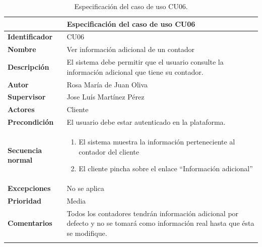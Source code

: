 \documentclass[pdftex,11pt,a4paper]{book}
\begin{document}


\renewcommand{\tablename}{Tabla}
\renewcommand{\arraystretch}{1,7}

\begin{center}
\begin{longtable}{|m{}|m{11cm}|}
\hline
\multicolumn{2}{|c|}{\textbf{Especificación del caso de uso CU06}}\\
\hline 
\endhead

\textbf{Identificador} & CU06  
\\ \hline
\textbf{Nombre} & Ver información adicional de un contador  
\\ \hline
\textbf{Descripción} & El sistema debe permitir que el usuario consulte la información adicional que tiene su contador.
\\ \hline
\textbf{Autor} & Rosa María de Juan Oliva 
\\ \hline
\textbf{Supervisor} & Jose Luís Martínez Pérez  
\\ \hline
\textbf{Actores} & Cliente
\\ \hline
\textbf{Precondición} & El usuario debe estar autenticado en la plataforma.
\\ \hline
\textbf{Secuencia normal} & 
\begin{enumerate}
\addtolength{\itemsep}{-3mm}
\item El sistema muestra la información perteneciente al contador del cliente
\item El cliente pincha sobre el enlace “Información adicional”
\end{enumerate}
\\ \hline
\textbf{Excepciones} & No se aplica
\\ \hline
\textbf{Prioridad} & Media 
\\ \hline
\textbf{Comentarios} & Todos los contadores tendrán información adicional por defecto y no se tomará como información real hasta que ésta se modifique.
\\ \hline

\caption{Especificación del caso de uso CU06.} \label{tablalarga:tablaCU06}
\end{longtable}
\end{center}


\renewcommand{\tablename}{Tabla}
\renewcommand{\arraystretch}{1,7}
\end{document}
